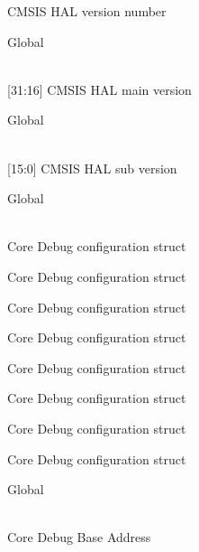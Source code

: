\begin{DoxyRefList}
\label{deprecated__deprecated000659}%
%
CMSIS HAL version number  
\item[{\parbox[t]{\linewidth}{Global \doxylink{core__sc300_8h_a0e2124db4f74f2b355904314accf1790}{\+\_\+\+\_\+\+SC300\+\_\+\+CMSIS\+\_\+\+VERSION\+\_\+\+MAIN} }}]\hfill \\
\label{deprecated__deprecated000657}%
%
\mbox{[}31\+:16\mbox{]} CMSIS HAL main version  
\item[{\parbox[t]{\linewidth}{Global \doxylink{core__sc300_8h_a664c9e59952455ddeee28173b864fe9d}{\+\_\+\+\_\+\+SC300\+\_\+\+CMSIS\+\_\+\+VERSION\+\_\+\+SUB} }}]\hfill \\
\label{deprecated__deprecated000658}%
%
\mbox{[}15\+:0\mbox{]} CMSIS HAL sub version  
\item[{\parbox[t]{\linewidth}{Global \doxylink{group___c_m_s_i_s___core_debug_gab6e30a2b802d9021619dbb0be7f5d63d}{Core\+Debug} }}]\hfill \\
\label{deprecated__deprecated000100}%
%
Core Debug configuration struct 

\label{deprecated__deprecated000154}%
%
Core Debug configuration struct 

\label{deprecated__deprecated000230}%
%
Core Debug configuration struct 

\label{deprecated__deprecated000293}%
%
Core Debug configuration struct 

\label{deprecated__deprecated000372}%
%
Core Debug configuration struct 

\label{deprecated__deprecated000448}%
%
Core Debug configuration struct 

\label{deprecated__deprecated000551}%
%
Core Debug configuration struct 

\label{deprecated__deprecated000653}%
%
Core Debug configuration struct  
\item[{\parbox[t]{\linewidth}{Global \doxylink{group___c_m_s_i_s___core_debug_ga680604dbcda9e9b31a1639fcffe5230b}{Core\+Debug\+\_\+\+BASE} }}]\hfill \\
\label{deprecated__deprecated000099}%
%
Core Debug Base Address 


\end{DoxyRefList}
